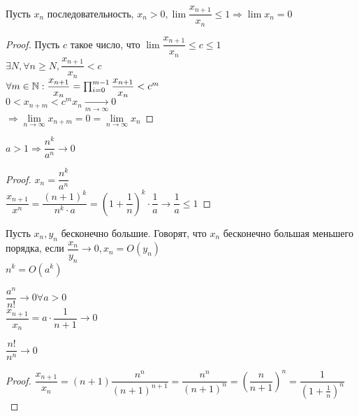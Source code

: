 \begin{theorem}
	Пусть $x_n$ последовательность, $ x_n > 0, \lim \dfrac{x_{n+1}}{x_n} \leq 1 \Rightarrow \lim x_n = 0 $
	\begin{proof}
		Пусть $ c $ такое число, что $  \lim \dfrac{x_{n+1}}{x_n} \leq c \leq 1 $ \\
		$ \exists N, \forall n \geq N,  \dfrac{x_{n+1}}{x_n} < c $ \\
		$ \forall m \in \mathbb{N} :  \dfrac{x_{n+1}}{x_n} = \prod_{i=0}^{m-1}  \dfrac{x_{n+1}}{x_n} < c^m $ \\
		$ 0 < x_{n+m} < c^mx_n \underset{m \rightarrow \infty}{\rightarrow} 0 $ \\
		$ \Rightarrow \lim\limits_{n \rightarrow \infty} x_{n+m} = 0 =  \lim\limits_{n \rightarrow \infty} x_{n} $

	\end{proof}
	\begin{consequence}
		$ a > 1 \Rightarrow \dfrac{n^k}{a^n} \rightarrow 0 $
		\begin{proof}
			$ x_n = \dfrac{n^k}{a^n} $ \\
			$ \dfrac{x_{n+1}}{x^n} = \dfrac{(n+1)^k}{n^k \cdot a} = (1 + \dfrac{1}{n})^k \cdot \dfrac{1}{a} \rightarrow \dfrac{1}{a} \leq 1 $
		\end{proof}
	\end{consequence}
\end{theorem}
\begin{definition}
	Пусть $ x_n, y_n $ бесконечно большие. Говорят, что $ x_n $ бесконечно большая меньшего порядка, если $ \dfrac{x_n}{y_n} \rightarrow 0, x_n = O(y_n) $ \\
	$ n^k = O(a^k) $ 
\end{definition}
\begin{consequence}
$ \dfrac{a^n}{n!} \rightarrow 0 \forall a > 0 $ \\

$ \dfrac{x_{n+1}}{x_n} = a \cdot \dfrac{1}{n+1} \rightarrow 0 $ 
\end{consequence}
\begin{consequence}
	$ \dfrac{n!}{n^n} \rightarrow 0 $ \\
	\begin{proof}
		$ \dfrac{x_{n+1}}{x_n} = (n+1)\dfrac{n^n}{(n+1)^{n+1}} = \dfrac{n^n}{(n+1)^n} = (\dfrac{n}{n+1})^n = \dfrac{1}{(1+\frac{1}{n})^n} $
	\end{proof}
	
\end{consequence}

